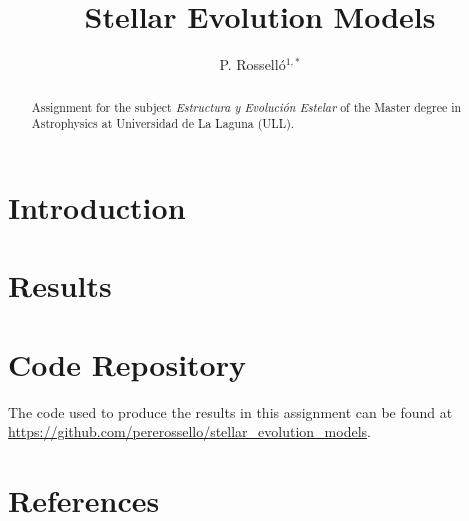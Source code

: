 \documentclass{anotherarticlestyle}
\title{Stellar Evolution Models}
\author{P. Rosselló$^{1,*}$}
\begin{document}
\maketitle

\begin{strip}
    \begin{abstract}
        {\small
            Assignment for the subject \textit{Estructura y Evolución Estelar} of the Master degree in Astrophysics at Universidad de La Laguna (ULL).
        }
    \end{abstract}
\end{strip}




\section{Introduction}


\section{Results}

\newpage
\section{Code Repository}
The code used to produce the results in this assignment can be found at \url{https://github.com/pererossello/stellar_evolution_models}.

\newpage
\pagebreak
\onecolumn
\twocolumn


\section*{References}




% 




% 

% 
\end{document}
